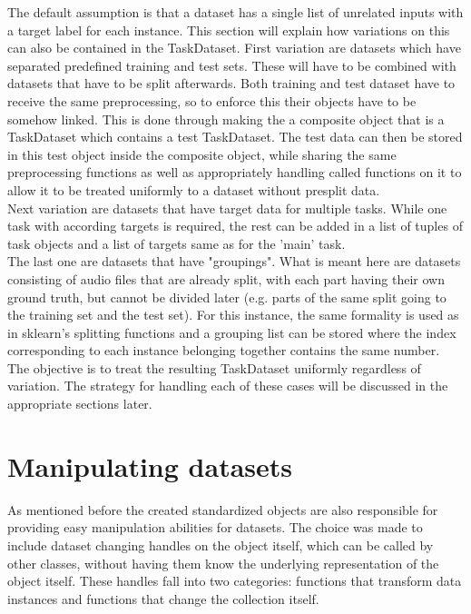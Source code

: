 The default assumption is that a dataset has a single list of unrelated inputs with a target label for each instance. This section will explain how variations on this can also be contained in the TaskDataset. First variation are datasets which have separated predefined training and test sets. These will have to be combined with datasets that have to be split afterwards. Both training and test dataset have to receive the same preprocessing, so to enforce this their objects have to be somehow linked. This is done through making the a composite object that is a TaskDataset which contains a test TaskDataset. The test data can then be stored in this test object inside the composite object, while sharing the same preprocessing functions as well as appropriately handling called functions on it to allow it to be treated uniformly to a dataset without presplit data. \\

Next variation are datasets that have target data for multiple tasks. While one task with according targets is required, the rest can be added in a list of tuples of task objects and a list of targets same as for the 'main' task. \\

The last one are datasets that have "groupings". What is meant here are datasets consisting of audio files that are already split, with each part having their own ground truth, but cannot be divided later (e.g. parts of the same split going to the training set and the test set). For this instance, the same formality is used as in sklearn's splitting functions and a grouping list can be stored where the index corresponding to each instance belonging together contains the same number. \\

The objective is to treat the resulting TaskDataset uniformly regardless of variation. The strategy for handling each of these cases will be discussed in the appropriate sections later. \\


\section{Manipulating datasets} \label{Design:Manipulating}

As mentioned before the created standardized objects are also responsible for providing easy manipulation abilities for datasets. The choice was made to include dataset changing handles on the object itself, which can be called by other classes, without having them know the underlying representation of the object itself. These handles fall into two categories: functions that transform data instances and functions that change the collection itself. \\

